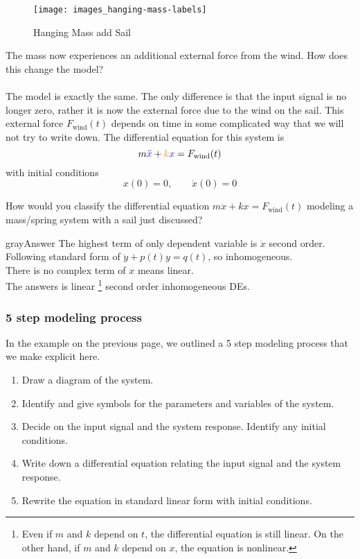 \begin{figure}[ht!]
  \centering
  \texttt{[image: images\_hanging-mass-labels]}
  \caption{Hanging Mass add Sail}
\end{figure}
The mass now experiences an additional external force from the wind.
How does this change the model?\\
\Solution\\
The model is exactly the same.
The only difference is that the input signal is no longer zero, rather it is now the external force due to the wind on the sail.
This external force $\displaystyle F_{\text {wind}}(t)$ depends on time in some complicated way that we will not try to write down. The differential equation for this system is
\begin{equation*}
  \displaystyle m {\color{blue} \ddot{x}} + {\color{orange}k} {\color{blue}x}
  =  F_{\text {wind}}(t)
\end{equation*}
with initial conditions
\begin{equation*}
  x(0) = 0, \qquad \dot{x}(0) = 0
\end{equation*}

\begin{exercise}
  How would you classify the differential equation $\displaystyle m\ddot x + k x = F_{\text {wind}}(t)$
  modeling a mass/spring system with a sail just discussed? 
\end{exercise}
\begin{mybox}{gray}{Answer}
  The highest term of only dependent variable is $\ddot x$ second order. \\
  Following standard form of  $\ddot y + p(t)y = q(t)$, so inhomogeneous.\\
  There is no complex term of $x$ means linear.\\
  The answers is linear \footnote{Even if $m$ and $k$ depend on $t$, the differential equation is still linear.
    On the other hand, if $m$ and $k$ depend on $x$, the equation is nonlinear.}
  second order inhomogeneous DEs.\\
\end{mybox}

\subsubsection{ 5 step modeling process}
In the example on the previous page, we outlined a 5 step modeling process that we make explicit here.
\begin{enumerate}
\item Draw a diagram of the system.
\item Identify and give symbols for the parameters and variables of the system.
\item Decide on the input signal and the system response. Identify any initial conditions.
\item Write down a differential equation relating the input signal and the system response.
\item Rewrite the equation in standard linear form with initial conditions.
\end{enumerate}
\clearpage

